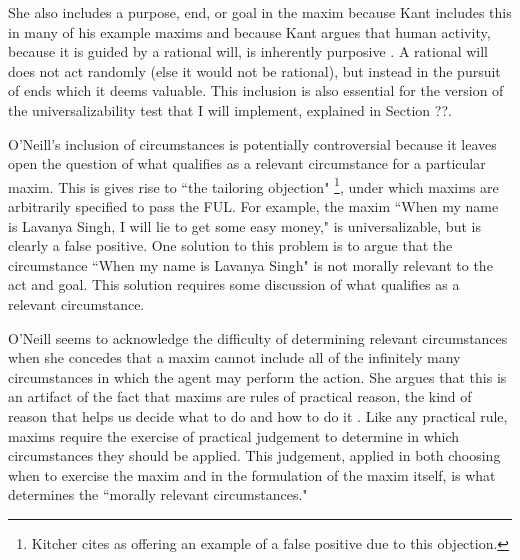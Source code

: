 \begin{isabellebody}
\begin{isamarkuptext}
She also includes a purpose, end, or goal in the maxim because Kant includes this in many of his 
example maxims and because Kant argues that human activity, because it is guided by a rational will, 
is inherently purposive \cite[4:428]{groundwork}. A rational will does not act randomly (else it would not be rational), 
but instead in the pursuit of ends which it deems valuable. This inclusion is also essential for the version of the universalizability test 
that I will implement, explained in Section ??.

O'Neill's inclusion of circumstances is potentially controversial because it leaves open the question of what qualifies as a 
relevant circumstance for a particular maxim. This is gives rise to ``the tailoring objection" \cite[217]{whatisamaxim} \footnote{Kitcher
cites \cite{kantsethicalthought}  as offering an example of a false positive due to this objection.}, 
under which maxims are arbitrarily specified to pass the FUL. For example, the maxim ``When my name is Lavanya Singh,
I will lie to get some easy money," is universalizable, but is clearly a false positive. One solution to 
this problem is to argue that the circumstance ``When my name is Lavanya Singh" is not morally relevant 
to the act and goal. This solution requires some discussion of what qualifies as a relevant circumstance.

O'Neill seems to acknowledge the difficulty of determining relevant circumstances when she concedes that a maxim cannot include all 
of the infinitely many circumstances in which the agent may perform the action\cite[4:428]{actingonprinciple}. She argues that this is 
an artifact of the fact that maxims are rules of practical reason, the kind of reason that helps us decide what to do 
and how to do it \cite{bok}. Like any practical rule, 
maxims require the exercise of practical judgement to determine in which circumstances they should be applied. 
This judgement, applied in both choosing when to exercise the maxim and in the formulation of the maxim 
itself, is what determines the ``morally relevant circumstances."


\end{isamarkuptext}
\end{isabellebody}
